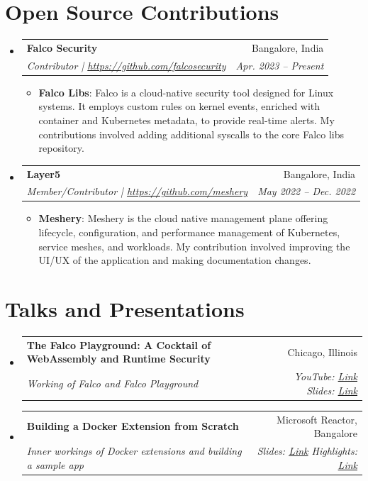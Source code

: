 \documentclass[letterpaper,11pt]{article}
\makeatletter
\newcommand{\resumeItem}[2]{
  \item\small{
    \textbf{#1}{: #2 \vspace{-2pt}}
  }
}
\newcommand{\resumeSubheading}[4]{
  \vspace{-1pt}\item
    \begin{tabular*}{0.97\textwidth}{l@{\extracolsep{\fill}}r}
      \textbf{#1} & #2 \\
      \textit{\small#3} & \textit{\small #4} \\
    \end{tabular*}\vspace{-5pt}
}
\newcommand{\resumeSubHeadingListStart}{\begin{itemize}[leftmargin=*]}
\newcommand{\resumeSubHeadingListEnd}{\end{itemize}}
\newcommand{\resumeItemListStart}{\begin{itemize}}
\newcommand{\resumeItemListEnd}{\end{itemize}\vspace{-5pt}}
\makeatother
\begin{document}
\section{Open Source Contributions}
\resumeSubHeadingListStart
  \resumeSubheading
    {Falco Security}{Bangalore, India}
    {Contributor | \href{https://github.com/falcosecurity}{https://github.com/falcosecurity}}{Apr. 2023 -- Present}
    \resumeItemListStart
      \resumeItem{Falco Libs}
        {Falco is a cloud-native security tool designed for Linux systems. It employs custom rules on kernel events, enriched with container and Kubernetes metadata, to provide real-time alerts. My contributions involved adding additional syscalls to the core Falco libs repository.}
    \resumeItemListEnd

  \resumeSubheading
    {Layer5}{Bangalore, India}
    {Member/Contributor | \href{https://github.com/meshery}{https://github.com/meshery}}{May 2022 -- Dec. 2022}
    \resumeItemListStart
      \resumeItem{Meshery}
        {Meshery is the cloud native management plane offering lifecycle, configuration, and performance management of Kubernetes, service meshes, and workloads. My contribution involved improving the UI/UX of the application and making documentation changes.}
    \resumeItemListEnd
\resumeSubHeadingListEnd



\section{Talks and Presentations}
\resumeSubHeadingListStart
  \resumeSubheading
    {The Falco Playground: A Cocktail of WebAssembly and Runtime Security}{Chicago, Illinois}
    {Working of Falco and Falco Playground}
    {YouTube: \href{https://youtu.be/imvDmhLRFRo?feature=shared}{Link} \quad Slides: \href{https://docs.google.com/presentation/d/17sfxAgLnr4ehiXhuEd9y9gcrihwq1bPD6al1aj0ZKao/edit?usp=sharing}{Link}}
  \resumeSubheading
    {Building a Docker Extension from Scratch}{Microsoft Reactor, Bangalore}
    {Inner workings of Docker extensions and building a sample app}
    {Slides: \href{https://docs.google.com/presentation/d/1eOYVtNRt8SeyemGuL_uZIlJyrxOAl_gprnx9v2aZAUM/edit?usp=sharing}{Link} \quad Highlights: \href{https://drive.google.com/drive/folders/1Cc1-D9oDcjYr8iZqH8Dr1RG95xvYg9NM?usp=sharing}{Link}}
\resumeSubHeadingListEnd

\end{document}
